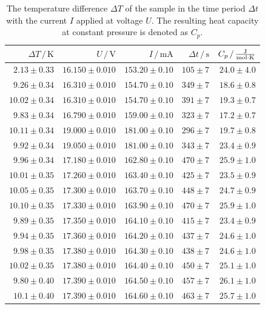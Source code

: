 \begin{table}
    \centering
    \caption{The temperature difference $\Delta T$ of the sample in the time period $\Delta t$ with the current $I$ applied at voltage $U$. The resulting heat capacity at constant pressure is denoted as $C_p$.}
    \label{tab:C_p}
    \begin{tabular}{r r r r r}
        \toprule
        $\Delta T \,/\, \unit{\kelvin}$ & $U \,/\, \unit{\volt}$ & $I \,/\, \unit{\milli\ampere}$ & $\Delta t \,/\, \unit{\second}$ & $C_p \,/\, \unit{\frac{\joule}{\mol \cdot \kelvin}}$ \\
        \midrule
        $2.13\pm0.33$ & $16.150\pm0.010$ & $153.20\pm0.10$ & $105\pm7$ & $24.0\pm4.0$ \\
        $9.26\pm0.34$ & $16.310\pm0.010$ & $154.70\pm0.10$ & $349\pm7$ & $18.6\pm0.8$ \\
        $10.02\pm0.34$ & $16.310\pm0.010$ & $154.70\pm0.10$ & $391\pm7$ & $19.3\pm0.7$ \\
        $9.83\pm0.34$ & $16.790\pm0.010$ & $159.00\pm0.10$ & $323\pm7$ & $17.2\pm0.7$ \\
        $10.11\pm0.34$ & $19.000\pm0.010$ & $181.00\pm0.10$ & $296\pm7$ & $19.7\pm0.8$ \\
        $9.92\pm0.34$ & $19.050\pm0.010$ & $181.00\pm0.10$ & $343\pm7$ & $23.4\pm0.9$ \\
        $9.96\pm0.34$ & $17.180\pm0.010$ & $162.80\pm0.10$ & $470\pm7$ & $25.9\pm1.0$ \\
        $10.01\pm0.35$ & $17.260\pm0.010$ & $163.40\pm0.10$ & $425\pm7$ & $23.5\pm0.9$ \\
        $10.05\pm0.35$ & $17.300\pm0.010$ & $163.70\pm0.10$ & $448\pm7$ & $24.7\pm0.9$ \\
        $10.10\pm0.35$ & $17.330\pm0.010$ & $163.90\pm0.10$ & $470\pm7$ & $25.9\pm1.0$ \\
        $9.89\pm0.35$ & $17.350\pm0.010$ & $164.10\pm0.10$ & $415\pm7$ & $23.4\pm0.9$ \\
        $9.94\pm0.35$ & $17.360\pm0.010$ & $164.20\pm0.10$ & $437\pm7$ & $24.6\pm1.0$ \\
        $9.98\pm0.35$ & $17.380\pm0.010$ & $164.30\pm0.10$ & $438\pm7$ & $24.6\pm1.0$ \\
        $10.02\pm0.35$ & $17.380\pm0.010$ & $164.40\pm0.10$ & $450\pm7$ & $25.1\pm1.0$ \\
        $9.80\pm0.40$ & $17.390\pm0.010$ & $164.50\pm0.10$ & $457\pm7$ & $26.1\pm1.0$ \\
        $10.1\pm0.40$ & $17.390\pm0.010$ & $164.60\pm0.10$ & $463\pm7$ & $25.7\pm1.0$ \\

\end{tabular}
\end{table}
